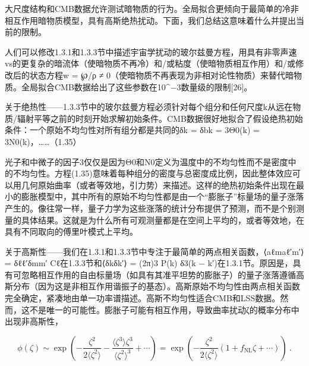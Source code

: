 



大尺度结构和CMB数据允许测试暗物质的行为。全局拟合更倾向于最简单的冷非相互作用暗物质模型，具有高斯绝热扰动。下面，我们总结这意味着什么并提出当前的限制。

人们可以修改1.3.1和1.3.3节中描述宇宙学扰动的玻尔兹曼方程，用具有非零声速vs的更复杂的暗流体（使暗物质不再冷）和/或粘度（使暗物质相互作用）和/或修改后的状态方程w = ℘/ρ ≠ 0（使暗物质不再表现为非相对论性物质）来替代暗物质。全局拟合CMB数据给出了这些参数在10^−3数量级的限制[26]。

关于绝热性——1.3.3节中的玻尔兹曼方程必须针对每个组分和任何尺度k从远在物质/辐射平等之前的时刻开始求解初始条件。CMB数据很好地拟合了假设绝热初始条件：一个原始不均匀性对所有组分都是共同的δk = δbk = 3Θ0(k) = 3N0(k)，……（1.35）

光子和中微子的因子3仅仅是因为Θ0和N0定义为温度中的不均匀性而不是密度中的不均匀性。方程(1.35)意味着每种组分的密度与总密度成比例，因此整体效应可以用几何原始曲率（或者等效地，引力势）来描述。这样的绝热初始条件出现在最小的膨胀模型中，其中所有的原始不均匀性都是由一个“膨胀子”标量场的量子涨落产生的。像往常一样，量子力学为这些涨落的统计分布提供了预测，而不是个别测量的具体结果。这就是为什么所有可观测量都是在空间上平均的，或者等效地，在具有不同取向的傅里叶模式上平均。

关于高斯性——我们在1.3.1和1.3.3节中专注于最简单的两点相关函数，⟨aℓmaℓ′m′⟩ = δℓℓ′δmm′ Cℓ在1.3.3节和⟨δkδk′⟩ = (2π)3 P(k) δ3(k − k′)在1.3.1节。原因是，具有可忽略相互作用的自由标量场（如具有其准平坦势的膨胀子）的量子涨落遵循高斯分布（因为这是非相互作用谐振子的基态）。高斯原始不均匀性由两点相关函数完全确定，紧凑地由单一功率谱描述。高斯不均匀性适合CMB和LSS数据。然而，这不是唯一的可能性。膨胀子可能有相互作用，导致曲率扰动ζ的概率分布中出现非高斯性，

\[ \phi(\zeta) \sim \exp \left( -\frac{\zeta^2}{2\langle\zeta^2\rangle} - \frac{\langle\zeta^3\rangle\zeta^3}{\langle\zeta^2\rangle^3} + \cdots \right) = \exp \left( -\frac{\zeta^2}{2\langle\zeta^2\rangle} (1 + f_{\text{NL}}\zeta + \cdots) \right) ~.\]

